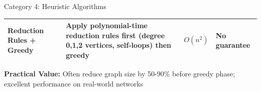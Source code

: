 \documentclass[aspectratio=169]{beamer}
\begin{document}
\begin{frame}{Category 4: Heuristic Algorithms}
\begin{table}
\begin{tabular}{@{}p{3.5cm}p{5.5cm}p{2cm}p{2cm}@{}}
			\textbf{Reduction Rules + Greedy}                                                           &
			Apply polynomial-time reduction rules first (degree 0,1,2 vertices, self-loops) then greedy &
			$O(n^2)$                                                                                    &
			No guarantee                                                                                                                                                         \\

			\bottomrule
		\end{tabular}
	\end{table}

	\vspace{0.2cm}
	\footnotesize
	\textbf{Practical Value:} Often reduce graph size by 50-90\% before greedy phase; excellent performance on real-world networks
\end{frame}

\end{document}
